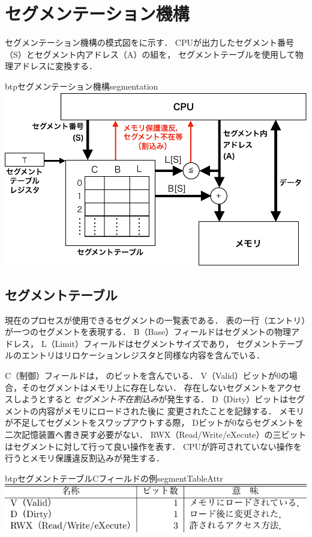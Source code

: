\section{セグメンテーション機構}
セグメンテーション機構の模式図をに示す．
CPUが出力したセグメント番号（S）とセグメント内アドレス（A）の組を，
セグメントテーブルを使用して物理アドレスに変換する．

\begin{myfig}{btp}{セグメンテーション機構}{segmentation}
  \includegraphics[scale=0.66]{Fig/segmentation-crop.pdf}
\end{myfig}

\subsection{セグメントテーブル}
現在のプロセスが使用できるセグメントの一覧表である．
表の一行（エントリ）が一つのセグメントを表現する．
B（Base）フィールドはセグメントの物理アドレス，
L（Limit）フィールドはセグメントサイズであり，
セグメントテーブルのエントリはリロケーションレジスタと同様な内容を含んでいる．

C（制御）フィールドは，
のビットを含んでいる．
V（Valid）ビットが0の場合，そのセグメントはメモリ上に存在しない．
存在しないセグメントをアクセスしようとすると
\emph{セグメント不在割込み}が発生する．
D（Dirty）ビットはセグメントの内容がメモリにロードされた後に
変更されたことを記録する．
メモリが不足してセグメントをスワップアウトする際，
Dビットが0ならセグメントを二次記憶装置へ書き戻す必要がない．
RWX（Read/Write/eXecute）の三ビットはセグメントに対して行って良い操作を表す．
CPUが許可されていない操作を行うとメモリ保護違反割込みが発生する．

\begin{mytable}{btp}{セグメントテーブルCフィールドの例}{segmentTableAttr}
  \includegraphics[scale=1.0]{Tbl/segmentTableAttr.pdf}
\end{mytable}

